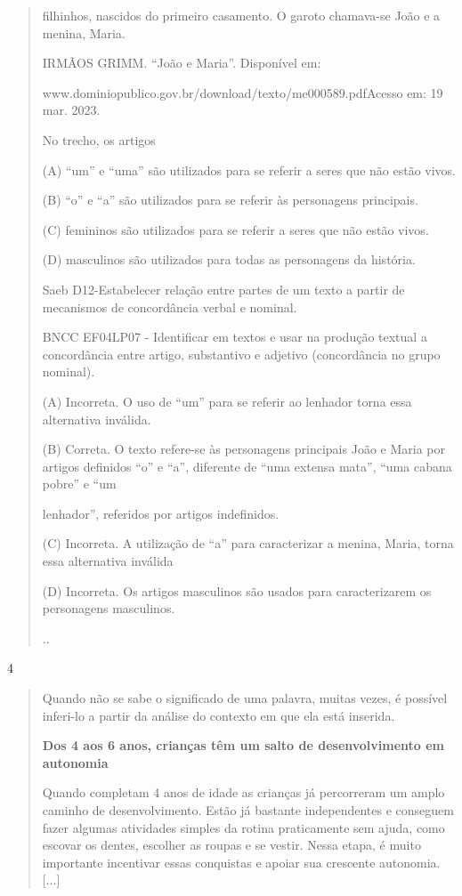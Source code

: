 \begin{escolha}
\begin{escolha}
{\begin{quote}
filhinhos, nascidos do primeiro casamento. O garoto chamava-se João e a
menina, Maria.

IRMÃOS GRIMM. ``João e Maria''. Disponível em:

www.dominiopublico.gov.br/download/texto/me000589.pdfAcesso em: 19 mar.
2023.

No trecho, os artigos

(A) ``um'' e ``uma'' são utilizados para se referir a seres que não
estão vivos.

(B) ``o'' e ``a'' são utilizados para se referir às personagens
principais.

(C) femininos são utilizados para se referir a seres que não estão
vivos.

(D) masculinos são utilizados para todas as personagens da história.

Saeb D12-Estabelecer relação entre partes de um texto a partir de
mecanismos de concordância verbal e nominal.

BNCC EF04LP07 - Identificar em textos e usar na produção textual a
concordância entre artigo, substantivo e adjetivo (concordância no grupo
nominal).

(A) Incorreta. O uso de ``um'' para se referir ao lenhador torna essa
alternativa inválida.

(B) Correta. O texto refere-se às personagens principais João e Maria
por artigos definidos ``o'' e ``a'', diferente de ``uma extensa mata'',
``uma cabana pobre'' e ``um

lenhador'', referidos por artigos indefinidos.

(C) Incorreta. A utilização de ``a'' para caracterizar a menina, Maria,
torna essa alternativa inválida

(D) Incorreta. Os artigos masculinos são usados para caracterizarem os
personagens masculinos.

..
\end{quote}

\num{4}

\begin{quote}
Quando não se sabe o significado de uma palavra, muitas vezes, é
possível inferi-lo a partir da análise do contexto em que ela está
inserida.

\textbf{Dos 4 aos 6 anos, crianças têm um salto de desenvolvimento em
autonomia}

Quando completam 4 anos de idade as crianças já percorreram um amplo
caminho de desenvolvimento. Estão já bastante independentes e conseguem
fazer algumas atividades simples da rotina praticamente sem ajuda, como
escovar os dentes, escolher as roupas e se vestir. Nessa etapa, é muito
importante incentivar essas conquistas e apoiar sua crescente autonomia.
{[}...{]}


\end{quote}}
\end{escolha}
\end{escolha}
